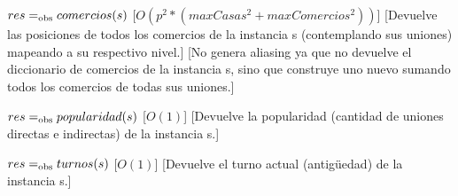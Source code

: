 \begin{Interfaz}
{$res =_{\mathrm{obs}} comercios(s)$}
[$O(p^2 * (maxCasas^2 + maxComercios^2))$]
[Devuelve las posiciones de todos los comercios de la instancia s (contemplando sus uniones) mapeando a su respectivo nivel.]
[No genera aliasing ya que no devuelve el diccionario de comercios de la instancia s, sino que construye uno nuevo sumando todos los comercios de todas sus uniones.]

{$res =_{\mathrm{obs}} popularidad(s)$}
[$O(1)$]
[Devuelve la popularidad (cantidad de uniones directas e indirectas) de la instancia s.]

{$res =_{\mathrm{obs}} turnos(s)$}
[$O(1)$]
[Devuelve el turno actual (antigüedad) de la instancia s.]

\end{Interfaz}


